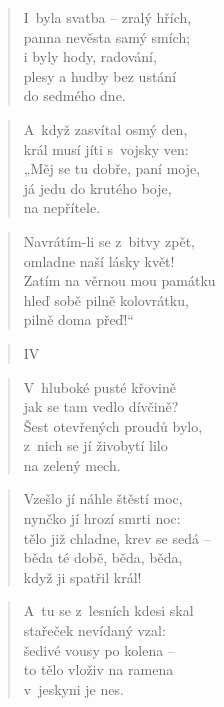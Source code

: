 \begin{verse}
I~byla svatba -- zralý hřích, \\
panna nevěsta samý smích; \\
i byly hody, radování, \\
plesy a hudby bez ustání \\
do sedmého dne.
\end{verse}

\begin{verse}
A~když zasvítal osmý den, \\
král musí jíti s~vojsky ven: \\
„Měj se tu dobře, paní moje, \\
já jedu do krutého boje, \\
na nepřítele.
\end{verse}

\begin{verse}
Navrátím-li se z~bitvy zpět, \\
omladne naší lásky květ! \\
Zatím na věrnou mou památku \\
hleď sobě pilně kolovrátku, \\
pilně doma přeď!“
\end{verse}

\begin{verse}
IV
\end{verse}

\begin{verse}
V~hluboké pusté křovině \\
jak se tam vedlo dívčině? \\
Šest otevřených proudů bylo, \\
z~nich se jí živobytí lilo \\
na zelený mech.
\end{verse}

\begin{verse}
Vzešlo jí náhle štěstí moc, \\
nynčko jí hrozí smrti noc: \\
tělo již chladne, krev se sedá -- \\
běda té době, běda, běda, \\
když ji spatřil král!
\end{verse}

\begin{verse}
A~tu se z~lesních kdesi skal \\
stařeček nevídaný vzal: \\
šedivé vousy po kolena -- \\
to tělo vloživ na ramena \\
v~jeskyni je nes.
\end{verse}

